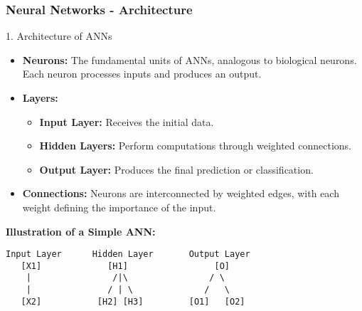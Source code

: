 \documentclass[aspectratio=169]{beamer}
\begin{document}
\begin{frame}[fragile]
    \frametitle{Neural Networks - Architecture}
    \begin{block}{1. Architecture of ANNs}
        \begin{itemize}
            \item \textbf{Neurons:} The fundamental units of ANNs, analogous to biological neurons. Each neuron processes inputs and produces an output.
            \item \textbf{Layers:} 
                \begin{itemize}
                    \item \textbf{Input Layer:} Receives the initial data.
                    \item \textbf{Hidden Layers:} Perform computations through weighted connections.
                    \item \textbf{Output Layer:} Produces the final prediction or classification.
                \end{itemize}
            \item \textbf{Connections:} Neurons are interconnected by weighted edges, with each weight defining the importance of the input.
        \end{itemize}
    \end{block}
    \begin{center}
        \textbf{Illustration of a Simple ANN:}
        \begin{verbatim}
Input Layer      Hidden Layer       Output Layer
   [X1]             [H1]                 [O]
    |                /|\                / \
    |               / | \              /   \
   [X2]           [H2] [H3]         [O1]   [O2]
        \end{verbatim}
    \end{center}
\end{frame}
\end{document}
